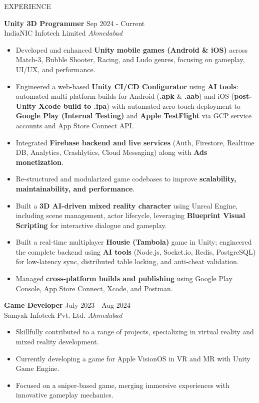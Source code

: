 \documentclass{resume} %
\begin{document}
\begin{rSection}{EXPERIENCE}

\textbf{Unity 3D Programmer} \hfill Sep 2024 - Current\\
IndiaNIC Infotech Limited \hfill \textit{Ahmedabad}
\begin{itemize}
    \itemsep -3pt {}
     \item Developed and enhanced \textbf{Unity mobile games (Android \& iOS)} across Match-3, Bubble Shooter, Racing, and Ludo genres, focusing on gameplay, UI/UX, and performance.
     \item Engineered a web-based \textbf{Unity CI/CD Configurator} using \textbf{AI tools}: automated multi-platform builds for Android (\textbf{.apk} \& \textbf{.aab}) and iOS (\textbf{post-Unity Xcode build to .ipa}) with automated zero-touch deployment to \textbf{Google Play (Internal Testing)} and \textbf{Apple TestFlight} via GCP service accounts and App Store Connect API.
     \item Integrated \textbf{Firebase backend and live services} (Auth, Firestore, Realtime DB, Analytics, Crashlytics, Cloud Messaging) along with \textbf{Ads monetization}.
     \item Re-structured and modularized game codebases to improve \textbf{scalability, maintainability, and performance}.
     \item Built a \textbf{3D AI-driven mixed reality character} using Unreal Engine, including scene management, actor lifecycle, leveraging \textbf{Blueprint Visual Scripting} for interactive dialogue and gameplay.
     \item Built a real-time multiplayer \textbf{Housie (Tambola)} game in Unity; engineered the complete backend using \textbf{AI tools} (Node.js, Socket.io, Redis, PostgreSQL) for low-latency sync, distributed table locking, and anti-cheat validation.
     \item Managed \textbf{cross-platform builds and publishing} using Google Play Console, App Store Connect, Xcode, and Postman.
\end{itemize}

\textbf{Game Developer} \hfill July 2023 - Aug 2024\\
Samyak Infotech Pvt. Ltd. \hfill \textit{Ahmedabad}
\begin{itemize}
    \itemsep -3pt {}
     \item Skillfully contributed to a range of projects, specializing in virtual reality and mixed reality development.
     \item Currently developing a game for Apple VisionOS in VR and MR with Unity Game Engine.
     \item Focused on a sniper-based game, merging immersive experiences with innovative gameplay mechanics.
\end{itemize}


\end{rSection}
\end{document}
